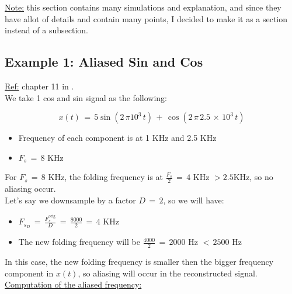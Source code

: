 \underline{Note:} this section contains many simulations and explanation, and since they have allot of details and contain many points, I decided to make it as a section instead of a subsection.\\ 


\subsection{Example 1: Aliased Sin and Cos}
\label{Sub:Downsampling_Aliasing}

\underline{Ref:} chapter 11 in \cite{book_Li_Tan_dsp_fundamentals_and_app}.\\

We take 1 cos and sin signal as the following:

\begin{equation}
    x(t) \, = \, 5 \sin(2 \, \pi 10^3 \, t ) \, + \, \cos(2 \, \pi \, 2.5 \, \times \, 10^3 \, t)
\end{equation}

\begin{itemize}
    \item Frequency of each component is at 1 KHz and 2.5 KHz
    
    \item $F_s \, = \, 8$ KHz
\end{itemize}

For $F_s \, = \, 8$ KHz, the folding frequency is at $\displaystyle\frac{F_s}{2} \, = \, 4$ KHz $> 2.5 $KHz, so no aliasing occur.\\

Let's say we downsample by a factor $D \, = \, 2$, so we will have:

\begin{itemize}
    \item $F_{s_D} \, = \, \displaystyle\frac{F_s^{\text{orig}}}{D} \, = \, \displaystyle\frac{8000}{2} \, = \, 4$ KHz
    
    
    \item The new folding frequency will be $\displaystyle\frac{4000}{2} \, = \, 2000$ Hz  $ < \, 2500$ Hz
    
\end{itemize}

In this case, the new folding frequency is smaller then the bigger frequency component in $x(t)$, so aliasing will occur in the reconstructed signal.\\

\newpage
\underline{Computation of the aliased frequency:}\\

